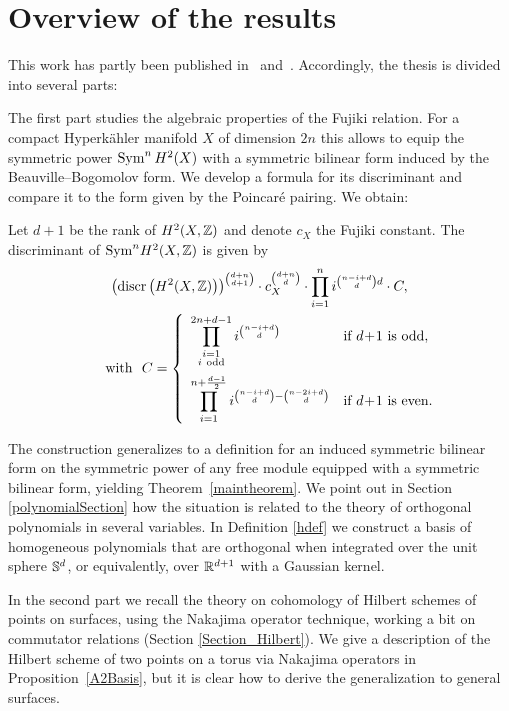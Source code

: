 \section{Overview of the results}
This work has partly been published in~\cite{Kapfer2} and~\cite{Kapfer}. 
Accordingly, the thesis is divided into several parts:

The first part \cite{Kapfer} studies the algebraic properties of the Fujiki relation. For a compact Hyperk\"ahler manifold $X$ of dimension $2n$ this allows to equip the symmetric power $\Sym^nH^2(X)$ with a symmetric bilinear form induced by the Beauville--Bogomolov form. We develop a formula for its discriminant and compare it to the form given by the Poincar\'e pairing.
We obtain:
{
\renewcommand{\thetheorem}{\ref{FujikiDiscr}}
\begin{theorem}
Let $d+1$ be the rank of $H^2(X,\Z)$ and denote $c_X$ the Fujiki constant.
The discriminant of $\Sym^n\!H^2(X,\Z)$ is given by
\begin{gather*}
\left(\discr \left(H^2(X,\Z)\right)\right)^{\binom{d+n}{d+1}}\cdot c_X^{\binom{d+n}{d}} \cdot \prod_{i=1}^n i^{\binom{n-i+d}{d}d} 
\cdot C, \\
\qquad \text{with } \ 
C=
\left\{
 \begin{array}{*2{l}p{5cm}}
 \displaystyle\prod_{\substack{i=1 \\ i\ \text{odd}\\\ }}^{2n+d-1}i^{\binom{n-i+d}{d}} &\text{if }d\!+\! 1\text{ is odd}, \\
 \displaystyle\prod_{i=1}^{n+\frac{d-1}{2}} i^{\binom{n-i+d}{d} - \binom{n-2i+d}{d}} &\text{if }d\! +\! 1\text{ is even}.
\end{array}
\right.
\end{gather*}
\end{theorem}
\addtocounter{theorem}{-1}
}
The construction generalizes to a definition for an induced symmetric bilinear form on the symmetric power of any free module equipped with a symmetric bilinear form, yielding Theorem~\ref{maintheorem}. We point out in Section \ref{polynomialSection} how the situation is related to the theory of orthogonal polynomials in several variables.
In Definition \ref{hdef} we construct a basis of homogeneous polynomials that are orthogonal when integrated over the unit sphere $\S^d$, or equivalently, over $\R^{d+1}$ with a Gaussian kernel.

In the second part we recall the theory on cohomology of Hilbert schemes of points on surfaces, using the Nakajima operator technique, working a bit on commutator relations (Section \ref{Section_Hilbert}).
We give a description of the Hilbert scheme of two points on a torus via Nakajima operators in Proposition~\ref{A2Basis}, but it is clear how to derive the generalization to general surfaces.

